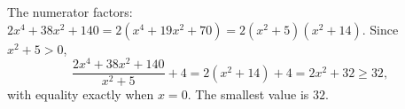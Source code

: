 The numerator factors: $2x^4+38x^2+140=2\left(x^4+19x^2+70\right)=2\left(x^2+5\right)\left(x^2+14\right)$. Since $x^2+5>0$,
\[\dfrac{2x^4+38x^2+140}{x^2+5}+4=2\left(x^2+14\right)+4=2x^2+32\ge32,\]
with equality exactly when $x=0$. The smallest value is $\boxed{32}$.
